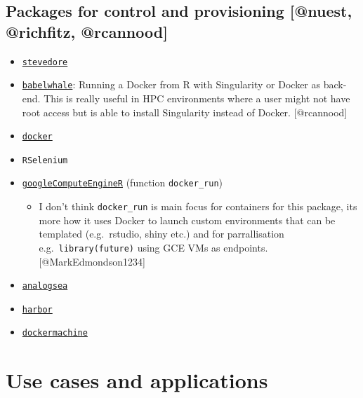 \hypertarget{packages-for-control-and-provisioning-richfitz-rcannoodnuest-richfitz-rcannood}{%
\subsection{\texorpdfstring{Packages for control and provisioning
{[}@nuest, @richfitz,
@rcannood{]}}{Packages for control and provisioning , @richfitz, @rcannood{[}@nuest, @richfitz, @rcannood{]}}}\label{packages-for-control-and-provisioning-richfitz-rcannoodnuest-richfitz-rcannood}}

\begin{itemize}
\tightlist
\item
  \href{https://github.com/richfitz/stevedore}{\texttt{stevedore}}
\item
  \href{https://cran.r-project.org/web/packages/babelwhale/index.html}{\texttt{babelwhale}}:
  Running a Docker from R with Singularity or Docker as back-end. This
  is really useful in HPC environments where a user might not have root
  access but is able to install Singularity instead of Docker.
  {[}@rcannood{]}
\item
  \href{https://bhaskarvk.github.io/docker/}{\texttt{docker}}
\item
  \texttt{RSelenium}
\item
  \href{https://cloudyr.github.io/googleComputeEngineR/}{\texttt{googleComputeEngineR}}
  (function \texttt{docker\_run})

  \begin{itemize}
  \tightlist
  \item
    I don't think \texttt{docker\_run} is main focus for containers for
    this package, its more how it uses Docker to launch custom
    environments that can be templated (e.g.~rstudio, shiny etc.) and
    for parrallisation e.g.~\texttt{library(future)} using GCE VMs as
    endpoints. {[}@MarkEdmondson1234{]}
  \end{itemize}
\item
  \href{https://github.com/sckott/analogsea}{\texttt{analogsea}}
\item
  \href{https://github.com/wch/harbor/}{\texttt{harbor}}
\item
  \href{https://github.com/cboettig/dockermachine}{\texttt{dockermachine}}
\end{itemize}

\hypertarget{use-cases-and-applications}{%
\section{Use cases and applications}\label{use-cases-and-applications}}

